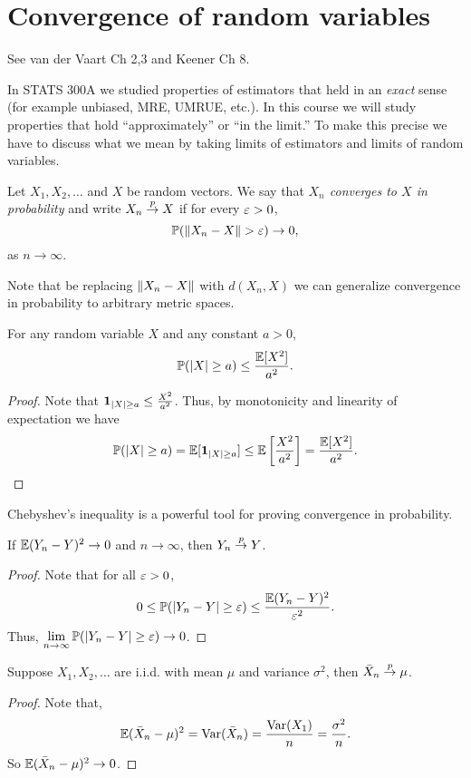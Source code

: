 \section{Convergence of random variables}
See van der Vaart Ch 2,3 and Keener Ch 8.

In STATS 300A we studied properties of estimators that held in an \emph{exact} sense (for example unbiased, MRE, UMRUE, etc.). In this course we will study properties that hold ``approximately'' or ``in the limit.'' To make this precise we have to discuss what we mean by taking limits of estimators and limits of random variables.
\begin{definition}
    Let $X_1,X_2,\ldots$ and $X$ be random vectors. We say that \emph{$X_n$ converges to $X$ in probability} and write $X_n \stackrel{p}{\to} X$ if for every $\varepsilon > 0$,
    \[{\mathbb{P}}(\left\|X_n - X\right\| > \varepsilon) \to 0,\]
    as $n \to \infty$.
\end{definition}
Note that be replacing $\left\|X_n - X\right\|$ with $d(X_n,X)$ we can generalize convergence in probability to arbitrary metric spaces.
\begin{theorem}
    For any random variable $X$ and any constant $a > 0$, 
    \[ {\mathbb{P}}({\left\lvert X\right\rvert} \ge a ) \le \frac{{\mathbb{E}}[X^2]}{a^2}.\]
\end{theorem}
\begin{proof}
    Note that ${{\bf 1}}_{{\left\lvert X\right\rvert} \ge a} \le \frac{X^2}{a^2}$. Thus, by monotonicity and linearity of expectation we have
    \[{\mathbb{P}}({\left\lvert X\right\rvert} \ge a) = {\mathbb{E}}[{{\bf 1}}_{{\left\lvert X\right\rvert} \ge a}] \le {\mathbb{E}}\left[\frac{X^2}{a^2}\right]=\frac{{\mathbb{E}}[X^2]}{a^2}.\qedhere\] 
\end{proof}
Chebyshev's inequality is a powerful tool for proving convergence in probability.
\begin{proposition}
    If ${\mathbb{E}}(Y_n-Y)^2 \to 0$ and $n \to \infty$, then $Y_n \stackrel{p}{\to} Y$.
\end{proposition}
\begin{proof}
    Note that for all $\varepsilon > 0$,
    \[0 \le {\mathbb{P}}({\left\lvert Y_n-Y\right\rvert} \ge \varepsilon) \le \frac{{\mathbb{E}}(Y_n-Y)^2}{\varepsilon^2}. \]
    Thus, $\lim\limits_{n \to \infty} {\mathbb{P}}({\left\lvert Y_n-Y\right\rvert} \ge \varepsilon) \to 0$. 
\end{proof}
\begin{example}
    Suppose $X_1,X_2,\ldots$ are i.i.d. with mean $\mu$ and variance $\sigma^2$, then $\bar{X}_n \stackrel{p}{\to} \mu$.
    \begin{proof}
        Note that,
        \[{\mathbb{E}}(\bar{X}_n-\mu)^2 = \operatorname{Var}(\bar{X}_n) = \frac{\operatorname{Var}(X_1)}{n} = \frac{\sigma^2}{n}.   \]
        So ${\mathbb{E}}(\bar{X}_n - \mu)^2 \to 0$.
    \end{proof}
\end{example}
